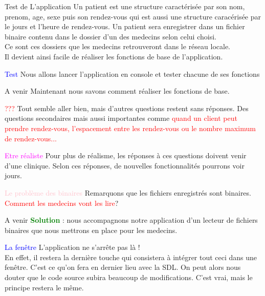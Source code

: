 \documentclass{beamer}
\begin{document}
\begin{frame}[t]{Test de L'application}
Un patient est une structure caractérisée par son nom, prenom, age, sexe puis son rendez-vous qui est aussi une structure caracérisée par le jours et l'heure de rendez-vous. Un patient sera enregistrer dans un fichier binaire contenu dans le dossier d'un des medecins selon celui choisi.\\Ce sont ces dossiers que les medecins retrouveront dans le réseau locale.\\Il devient ainsi facile de réaliser les fonctions de base de l'application. \\ 

\begin{block}{\textcolor{blue}{Test}}
 Nous allons lancer l'application en console et tester chacune de ses fonctions\pause
\end{block}
\end{frame}
\begin{frame}[t]{A venir}
Maintenant nous savons comment réaliser les fonctions de base.\pause 
\begin{alertblock}{\textcolor{red}{???}}
Tout semble aller bien, mais d'autres questions restent sans réponses.
 Des questions secondaires mais aussi importantes comme \textcolor{red}{quand un client peut prendre rendez-vous, l'espacement entre les rendez-vous ou le nombre maximum de rendez-vous...}\pause 
\end{alertblock}
\begin{block}{\textcolor{magenta}{Etre réaliste}}
Pour plus de réalisme, les réponses à ces questions doivent venir d'une clinique. Selon ces réponses, de nouvelles fonctionnalités pourrons voir jours.\pause 
\end{block}
\begin{block}{\textcolor{pink}{Le problème des binaires}}
Remarquons que les fichiers enregistrés sont binaires. \textcolor{red}{Comment les medecins vont les lire}? \pause 
\end{block}
\end{frame}

\begin{frame}[t]{A venir}
 \textcolor{green}{\textbf{Solution}} : nous accompagnons notre application d'un lecteur de fichiers binaires que nous mettrons en place pour les medecins.
\begin{block}{\textcolor{blue}{La fenêtre}}
L'application ne s'arrête pas là ! \\En effet, il restera la dernière touche qui consistera à intégrer tout ceci dans une fenêtre. C'est ce qu'on fera en dernier lieu avec la SDL. On peut alors nous douter que le code source subira beaucoup de modifications. C'est vrai, mais le principe restera le même. 
\end{block}
\end{frame}
\end{document}
